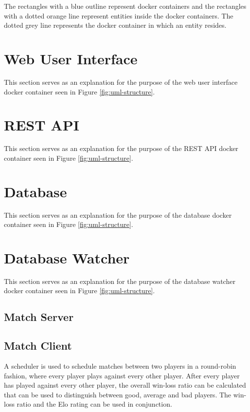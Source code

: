 \documentclass[a4paper, 12pt]{report}
\begin{document}
The rectangles with a blue outline represent docker containers and the rectangles
with a dotted orange line represent entities inside the docker containers. The
dotted grey line represents the docker container in which an entity resides.

\section{Web User Interface}

This section serves as an explanation for the purpose of the web user interface
docker container seen in Figure \ref{fig:uml-structure}. \\

\section{REST API}

This section serves as an explanation for the purpose of the REST API docker
container seen in Figure \ref{fig:uml-structure}. \\

\section{Database}

This section serves as an explanation for the purpose of the database docker
container seen in Figure \ref{fig:uml-structure}. \\

\section{Database Watcher}

This section serves as an explanation for the purpose of the database watcher
docker container seen in Figure \ref{fig:uml-structure}. \\

\subsection{Match Server}

\subsection{Match Client}

A scheduler is used to schedule matches between two players in a round-robin
\mbox{fashion}, where every player plays against every other player. After every player
has played against every other player, the overall win-loss ratio can be calculated
that can be used to \mbox{distinguish} between good, average and bad players. The
win-loss ratio and the Elo rating \cite{elo} can be used in conjunction. \\
\end{document}
